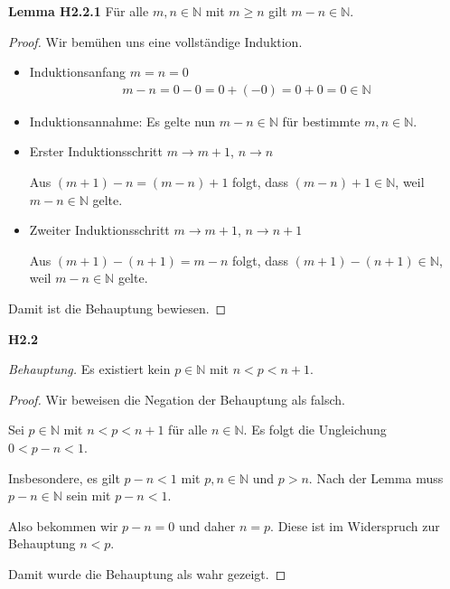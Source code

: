 \documentclass[12pt]{extarticle}
\begin{document}
\textbf{Lemma H2.2.1}  Für alle \(m, n \in \mathbb{N}\) mit \(m \geq n\)
gilt \(m-n\in \mathbb{N}\).

\begin{proof}
  Wir bemühen uns eine vollständige Induktion.

  \begin{itemize}
  \item Induktionsanfang \(m=n=0\)
\begin{align*}
m-n=0-0=0+(-0)=0+0=0 \in \mathbb{N}
\end{align*}
\item Induktionsannahme: Es gelte nun \(m-n \in \mathbb{N}\) für
  bestimmte \(m, n \in \mathbb{N}\).
\item Erster Induktionsschritt \(m \rightarrow m+1\), \(n \rightarrow n\)

  Aus \((m+1)-n=(m-n)+1\) folgt, dass \((m-n)+1 \in \mathbb{N}\), weil
  \(m-n \in \mathbb{N}\) gelte.

\item Zweiter Induktionsschritt \(m \rightarrow m+1\), $n \rightarrow n
  + 1$

  Aus \((m+1)-(n+1)=m-n\) folgt, dass \((m+1)-(n+1) \in \mathbb{N}\), weil
  \(m-n \in \mathbb{N}\) gelte.

\end{itemize}

Damit ist die Behauptung bewiesen.
  \end{proof}

  \textbf{H2.2}

  \textit{Behauptung.} Es existiert kein \(p \in \mathbb{N}\) mit $n < p
  < n+1$.

  \begin{proof}
    Wir beweisen die Negation der Behauptung als falsch.


    \vspace{4mm} Sei \(p \in \mathbb{N}\) mit \(n < p < n+1\) für alle
    \(n \in \mathbb{N}\).  Es folgt die Ungleichung \(0 < p-n < 1\).


    Insbesondere, es gilt \(p-n<1\) mit \(p, n \in \mathbb{N}\) und $p >
    n$.  Nach der Lemma muss \(p-n \in \mathbb{N}\) sein mit \(p-n<1\).

    Also bekommen wir \(p-n=0\) und daher \(n=p\).  Diese ist im
    Widerspruch zur Behauptung \(n<p\).

    Damit wurde die Behauptung als wahr gezeigt.
  \end{proof}
\vspace{2mm}
\end{document}
